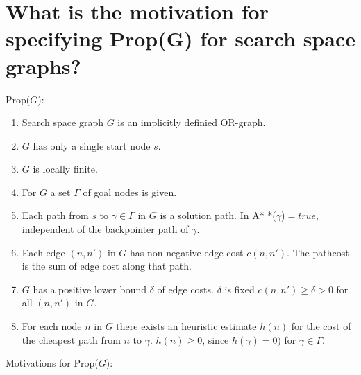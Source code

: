 \documentclass[12pt, a4paper]{article}
\begin{document}
\section{What is the motivation for specifying Prop(G) for search space graphs?}
Prop($G$):
\begin{enumerate}
\item Search space graph $G$ is an implicitly definied OR-graph.
\item $G$ has only a single start node $s$.
\item $G$ is locally finite.
\item For $G$ a set $\Gamma$ of goal nodes is given. 
\item Each path from $s$ to $\gamma \in \Gamma$ in $G$ is a solution path. In A* *($\gamma$)$= true$, independent of the backpointer path of $\gamma$.
\item Each edge $(n, n')$ in $G$ has non-negative edge-cost $c(n, n')$. The pathcost is the sum of edge cost along that path.
\item $G$ has a positive lower bound $\delta$ of edge costs. $\delta$ is fixed $c(n, n') \geq \delta > 0$ for all $(n, n')$ in $G$.
\item For each node $n$ in $G$ there exists an heuristic estimate $h(n)$ for the cost of the cheapest path from $n$ to $\gamma$. $h(n) \geq 0$, since $h(\gamma) = 0)$ for $\gamma \in \Gamma$.
\end{enumerate}
Motivations for Prop($G$):
\end{document}
